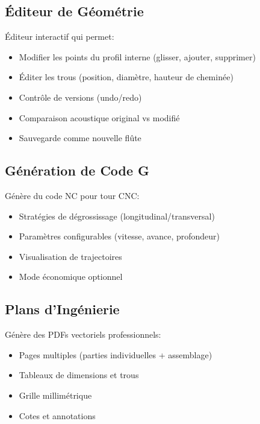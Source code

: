 \documentclass[12pt,a4paper,twocolumn]{article}
\begin{document}
\subsection{Éditeur de Géométrie}

Éditeur interactif qui permet:
\begin{itemize}
    \item Modifier les points du profil interne (glisser, ajouter, supprimer)
    \item Éditer les trous (position, diamètre, hauteur de cheminée)
    \item Contrôle de versions (undo/redo)
    \item Comparaison acoustique original vs modifié
    \item Sauvegarde comme nouvelle flûte
\end{itemize}

\subsection{Génération de Code G}

Génère du code NC pour tour CNC:
\begin{itemize}
    \item Stratégies de dégrossissage (longitudinal/transversal)
    \item Paramètres configurables (vitesse, avance, profondeur)
    \item Visualisation de trajectoires
    \item Mode économique optionnel
\end{itemize}

\subsection{Plans d'Ingénierie}

Génère des PDFs vectoriels professionnels:
\begin{itemize}
    \item Pages multiples (parties individuelles + assemblage)
    \item Tableaux de dimensions et trous
    \item Grille millimétrique
    \item Cotes et annotations
\end{itemize}
\end{document}

